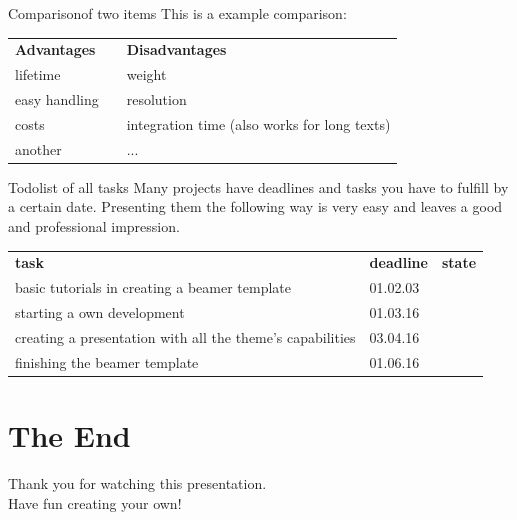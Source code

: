 \documentclass[	12pt, 				
				t,					
				aspectratio=169,
				]{beamer}
\begin{document}
	\begin{frame}{Comparison}{of two items}
		This is a example comparison:
		\begin{center}
		\begin{tabularx}{\textwidth}{XcX}
			\textbf{Advantages} & & \textbf{Disadvantages}\\
			lifetime & \drawopp & weight \\
			easy handling & \drawopp & resolution \\
			costs & \drawopp & integration time (also works for long texts)\\
			another & \drawopp & ... \\
		\end{tabularx}
		\end{center}
	\end{frame} 
	
	
	\begin{frame}{Todo}{list of all tasks}
		Many projects have deadlines and tasks you have to fulfill by a certain date.
		Presenting them the following way is very easy and leaves a good and professional impression.
		\vfill
		\begin{tabularx}{\textwidth}{Xll}
			\textbf{task} & \textbf{deadline} & \textbf{state}\\
			basic tutorials in creating a beamer template & 01.02.03 & \myCheck \\
			starting a own development & 01.03.16 & \myCheck \\
			creating a presentation with all the theme's capabilities & 03.04.16 & \myCheck \\
			finishing the beamer template & 01.06.16 & \myUnCheck\\
		\end{tabularx}
		\vfill
	\end{frame}
	
		
	\section*{The End}
	\begin{frame}
		\vspace{2.2cm}
		\begin{center}
			\huge Thank you for watching this presentation.\\
			Have fun creating your own!
		\end{center}
		\vfill
	\end{frame}
	
\end{document}
